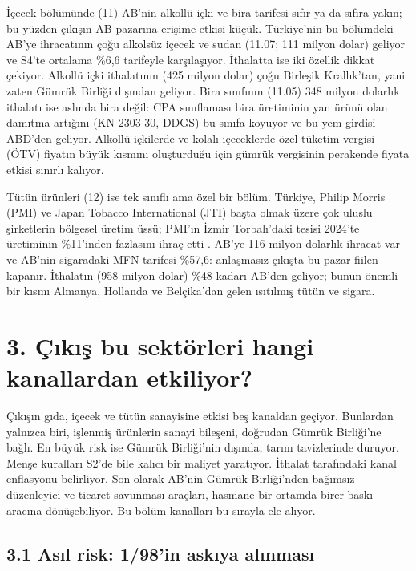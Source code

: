 İçecek bölümünde (11) AB'nin alkollü içki ve bira tarifesi sıfır ya da sıfıra yakın; bu yüzden çıkışın AB pazarına erişime etkisi küçük. Türkiye'nin bu bölümdeki AB'ye ihracatının çoğu alkolsüz içecek ve sudan (11.07; 111 milyon dolar) geliyor ve S4'te ortalama \%6,6 tarifeyle karşılaşıyor. İthalatta ise iki özellik dikkat çekiyor. Alkollü içki ithalatının (425 milyon dolar) çoğu Birleşik Krallık'tan, yani zaten Gümrük Birliği dışından geliyor. Bira sınıfının (11.05) 348 milyon dolarlık ithalatı ise aslında bira değil: CPA sınıflaması bira üretiminin yan ürünü olan damıtma artığını (KN 2303 30, DDGS) bu sınıfa koyuyor ve bu yem girdisi ABD'den geliyor. Alkollü içkilerde ve kolalı içeceklerde özel tüketim vergisi (ÖTV) fiyatın büyük kısmını oluşturduğu için gümrük vergisinin perakende fiyata etkisi sınırlı kalıyor.

Tütün ürünleri (12) ise tek sınıflı ama özel bir bölüm. Türkiye, Philip Morris (PMI) ve Japan Tobacco International (JTI) başta olmak üzere çok uluslu şirketlerin bölgesel üretim üssü; PMI'ın İzmir Torbalı'daki tesisi 2024'te üretiminin \%11'inden fazlasını ihraç etti \etiketV{}. AB'ye 116 milyon dolarlık ihracat var ve AB'nin sigaradaki MFN tarifesi \%57,6: anlaşmasız çıkışta bu pazar fiilen kapanır. İthalatın (958 milyon dolar) \%48 kadarı AB'den geliyor; bunun önemli bir kısmı Almanya, Hollanda ve Belçika'dan gelen ısıtılmış tütün ve sigara.

\hypertarget{nace_kartlar_10-12-3-uxe7ux131kux131ux15f-bu-sektuxf6rleri-hangi-kanallardan-etkiliyor}{%
\section{3. Çıkış bu sektörleri hangi kanallardan etkiliyor?}\label{nace_kartlar_10-12-3-uxe7ux131kux131ux15f-bu-sektuxf6rleri-hangi-kanallardan-etkiliyor}}

Çıkışın gıda, içecek ve tütün sanayisine etkisi beş kanaldan geçiyor. Bunlardan yalnızca biri, işlenmiş ürünlerin sanayi bileşeni, doğrudan Gümrük Birliği'ne bağlı. En büyük risk ise Gümrük Birliği'nin dışında, tarım tavizlerinde duruyor. Menşe kuralları S2'de bile kalıcı bir maliyet yaratıyor. İthalat tarafındaki kanal enflasyonu belirliyor. Son olarak AB'nin Gümrük Birliği'nden bağımsız düzenleyici ve ticaret savunması araçları, hasmane bir ortamda birer baskı aracına dönüşebiliyor. Bu bölüm kanalları bu sırayla ele alıyor.

\hypertarget{nace_kartlar_10-12-31-asux131l-risk-198in-askux131ya-alux131nmasux131}{%
\subsection{3.1 Asıl risk: 1/98'in askıya alınması}\label{nace_kartlar_10-12-31-asux131l-risk-198in-askux131ya-alux131nmasux131}}


